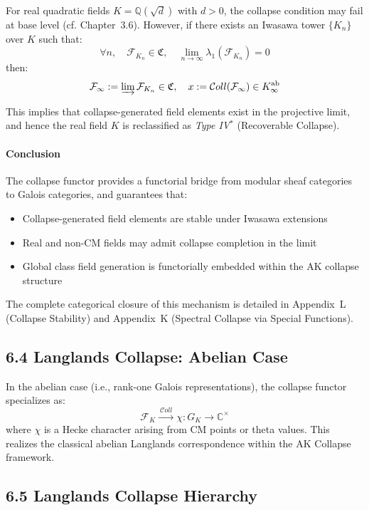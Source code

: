 \documentclass[11pt]{article}
\begin{document}
For real quadratic fields \( K = \mathbb{Q}(\sqrt{d}) \) with \( d > 0 \), the collapse condition may fail at base level (cf. Chapter~3.6). However, if there exists an Iwasawa tower \( \{K_n\} \) over \( K \) such that:
\[
\forall n, \quad \mathcal{F}_{K_n} \in \mathfrak{C}, \quad \lim_{n \to \infty} \lambda_1(\mathcal{F}_{K_n}) = 0
\]
then:
\[
\mathcal{F}_\infty := \varinjlim \mathcal{F}_{K_n} \in \mathfrak{C}, \quad x := \mathcal{C}oll(\mathcal{F}_\infty) \in K_\infty^{\mathrm{ab}}
\]

This implies that collapse-generated field elements exist in the projective limit, and hence the real field \( K \) is reclassified as \emph{Type IV$^\ast$} (Recoverable Collapse).

\medskip

\paragraph{Conclusion}

The collapse functor provides a functorial bridge from modular sheaf categories to Galois categories, and guarantees that:
\begin{itemize}
    \item Collapse-generated field elements are stable under Iwasawa extensions
    \item Real and non-CM fields may admit collapse completion in the limit
    \item Global class field generation is functorially embedded within the AK collapse structure
\end{itemize}

The complete categorical closure of this mechanism is detailed in Appendix~L (Collapse Stability) and Appendix~K (Spectral Collapse via Special Functions).


\subsection{6.4 Langlands Collapse: Abelian Case}

In the abelian case (i.e., rank-one Galois representations), the collapse functor specializes as:
\[
\mathcal{F}_K \xrightarrow{\ \mathcal{C}oll\ } \chi : G_K \to \mathbb{C}^\times
\]
where \( \chi \) is a Hecke character arising from CM points or theta values.  
This realizes the classical abelian Langlands correspondence within the AK Collapse framework.

\subsection{6.5 Langlands Collapse Hierarchy}
\end{document}
